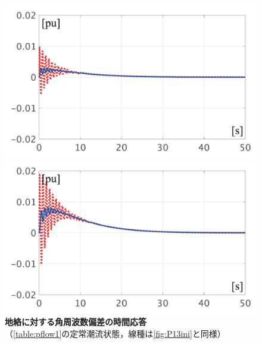 \documentclass[tombow,dvipdfmx]{corona-a5-1.1}
\begin{document}
\begin{figure}[t]
  \centering
  {
  \begin{minipage}{0.49\linewidth}
    \centering
    \includegraphics[width = 1.0\linewidth]{figs/50mP1}
  \end{minipage}
  \begin{minipage}{0.49\linewidth}
    \centering
    \includegraphics[width = 1.0\linewidth]{figs/100mP1}
  \end{minipage}
  \medskip
  \caption{\textbf{地絡に対する角周波数偏差の時間応答}
  \\ \centering （\ref{table:pflow1}の定常潮流状態，線種は\ref{fig:P13ini}と同様）}
  \label{fig:P1fault}
  }
\medskip
\end{figure}
\end{document}
